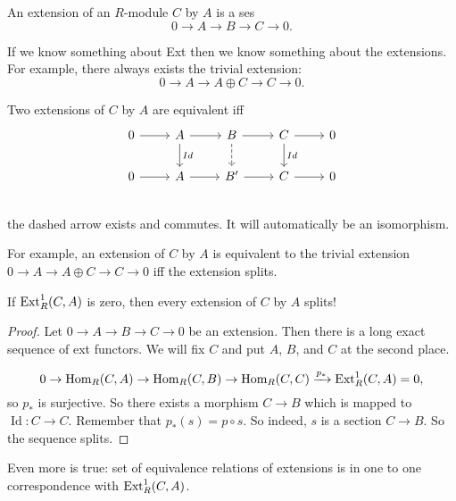 \begin{definition}
    An extension of an $R$-module $C$ by $A$ is a ses
    \[
    0 \to A \to  B \to  C \to  0
    .\] 
\end{definition}
If we know something about Ext then we know something about the extensions.
For example, there always exists the trivial extension:
\[
0 \to  A \to A \oplus C \to  C \to  0 
.\] 
\begin{definition}
    Two extensions of $C$ by $A$ are equivalent iff
    \[
        \begin{tikzcd}
            0 \arrow[r, ""] & A\arrow[d, "Id"] \arrow[r, ""] & B \arrow[d, "", dashed]\arrow[r, ""] & C \arrow[r, ""] \arrow[d, "Id"]& 0\\
            0 \arrow[r, ""] & A \arrow[r, ""] & B' \arrow[r, ""] & C \arrow[r, ""] & 0\\
        \end{tikzcd}
    \]
    the dashed arrow exists and commutes. It will automatically be an isomorphism.
\end{definition}
\begin{eg}
    For example, an extension of $C$ by $A$ is equivalent to  the trivial extension $0 \to  A \to  A \oplus C \to  C \to  0$ iff the extension splits.
\end{eg}

\begin{prop}[2.13]
    If $\operatorname{Ext}_R^{1}(C, A)$ is zero, then every extension of $C$ by $A$ splits!
\end{prop}
\begin{proof}
    Let $0 \to  A \to B \to  C \to  0$ be an extension.
    Then there is a long exact sequence of ext functors.
    We will fix $C$ and put  $A$, $B$, and $C$ at the second place.

    \[
        0 \to  \operatorname{Hom}_{R}(C, A) \to  \operatorname{Hom}_{R}(C, B) \to \operatorname{Hom}_{R}(C, C) \xrightarrow{p_{*}}  \operatorname{Ext}_R^{1}(C, A) = 0
    ,\] 
    so $p_*$ is surjective.
    So there exists a morphism  $C \to  B$ which is mapped to $\operatorname{Id}: C \to  C$.  Remember that $p_*(s) = p  \circ  s$. So indeed, $s$ is a section $C\to  B$.
    So the sequence splits.
\end{proof}

Even more is true: set of equivalence relations of extensions is in one to one correspondence with $\operatorname{Ext}_R^{1}(C, A)$.
